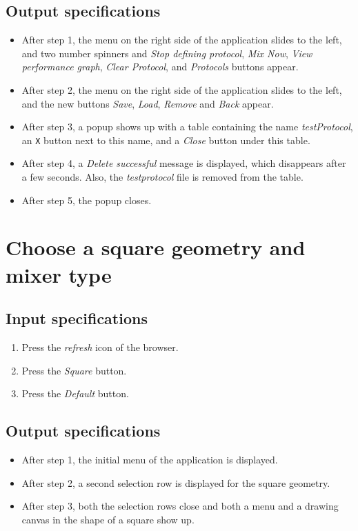 \subsection*{Output specifications}
\begin{itemize}
\item After step 1, the menu on the right side of the application slides to the left, and two number spinners and \emph{Stop defining protocol}, \emph{Mix Now}, \emph{View performance graph}, \emph{Clear Protocol}, and \emph{Protocols} buttons appear.
\item After step 2, the menu on the right side of the application slides to the left, and the new buttons \emph{Save}, \emph{Load}, \emph{Remove} and \emph{Back} appear.
\item After step 3, a popup shows up with a table containing the name \emph{testProtocol}, an \texttt{X} button next to this name, and a \emph{Close} button under this table.
\item After step 4, a \emph{Delete successful} message is displayed, which disappears after a few seconds. Also, the \emph{testprotocol} file is removed from the table.
\item After step 5, the popup closes.
\end{itemize}

\section{Choose a square geometry and mixer type}

\subsection*{Input specifications}
\begin{enumerate}
\item Press the \emph{refresh} icon of the browser.
\item Press the \emph{Square} button.
\item Press the \emph{Default} button.
\end{enumerate}

\subsection*{Output specifications}
\begin{itemize}
\item After step 1, the initial menu of the application is displayed.
\item After step 2, a second selection row is displayed for the square geometry.
\item After step 3, both the selection rows close and both a menu and a drawing canvas in the shape of a square show up.
\end{itemize}

